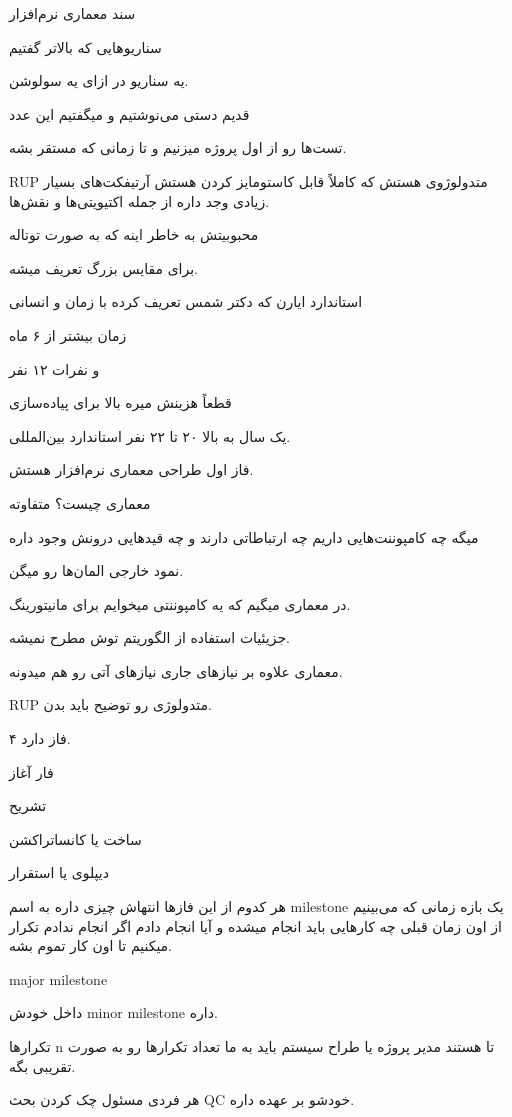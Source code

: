 سند معماری نرم‌افزار

سناریو‌هایی که بالاتر گفتیم

یه سناریو در ازای یه سولوشن.

قدیم دستی می‌نوشتیم و میگفتیم این عدد 

تست‌ها رو از اول پروژه میزنیم و تا زمانی که مستقر بشه.

RUP متدولوژوی هستش که کاملاً قابل کاستومایز کردن هستش آرتیفکت‌های بسیار زیادی
وجد داره از جمله اکتیویتی‌ها و نقش‌ها.

محبوبیتش به خاطر اینه که به صورت توتاله

برای مقایس بزرگ تعریف میشه.

استاندارد ایارن که دکتر شمس تعریف کرده با 
زمان و انسانی

زمان بیشتر از ۶ ماه

و نفرات ۱۲ نفر

قطعاً هزینش میره بالا برای پیاده‌سازی

یک سال به بالا ۲۰ تا ۲۲ نفر استاندارد بین‌المللی.

فاز اول طراحی معماری نرم‌افزار هستش.

معماری چیست؟ متفاوته

میگه چه کامپوننت‌هایی داریم چه ارتباطاتی دارند و چه قید‌هایی درونش وجود داره

نمود خارجی المان‌ها رو میگن.

در معماری میگیم که یه کامپوننتی میخوایم برای مانیتورینگ.

جزیئیات استفاده از الگوریتم توش مطرح نمیشه.

معماری علاوه بر نیاز‌های جاری نیاز‌های آتی رو هم میدونه.

RUP متدولوژی رو توضیح باید بدن.

۴ فاز دارد.

فار آغاز

تشریح 

ساخت یا کانساتراکشن

دیپلوی یا استقرار

هر کدوم از این فاز‌ها انتهاش چیزی داره به اسم milestone یک بازه زمانی که
می‌بینیم از اون زمان قبلی چه کار‌هایی باید انجام میشده و آیا انجام دادم اگر
انجام ندادم تکرار میکنیم تا اون کار تموم بشه.

major milestone

داخل خودش minor milestone داره.

تکرار‌ها n تا هستند مدیر پروژه یا طراح سیستم باید به ما تعداد تکرار‌ها رو به
صورت تقریبی بگه.

هر فردی مسئول چک کردن بحث QC خودشو بر عهده داره.

